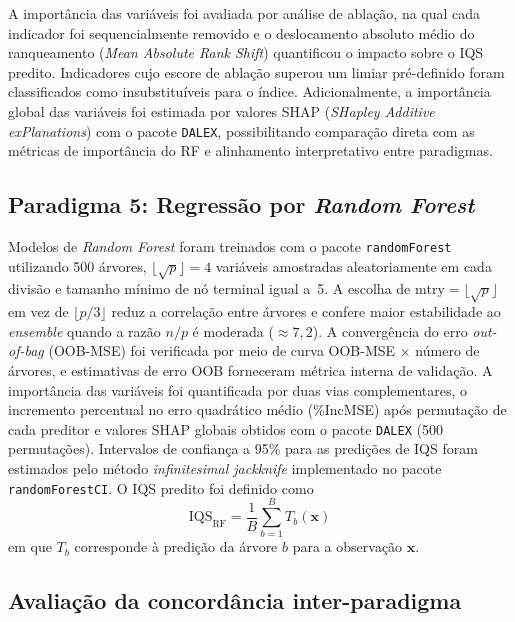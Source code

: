 \documentclass[pdflatex,sn-basic]{sn-jnl}%
\begin{document}
A importância das variáveis foi avaliada por análise de ablação, na qual cada indicador foi sequencialmente removido e o deslocamento absoluto médio do ranqueamento (\textit{Mean Absolute Rank Shift}) quantificou o impacto sobre o IQS predito. Indicadores cujo escore de ablação superou um limiar pré-definido foram classificados como insubstituíveis para o índice. Adicionalmente, a importância global das variáveis foi estimada por valores SHAP (\textit{SHapley Additive exPlanations}) com o pacote \texttt{DALEX}, possibilitando comparação direta com as métricas de importância do RF e alinhamento interpretativo entre paradigmas.

\subsection{Paradigma 5: Regressão por \textit{Random Forest}}\label{subsec:rf}

Modelos de \textit{Random Forest} foram treinados com o pacote \texttt{randomForest} utilizando 500 árvores, $\lfloor \sqrt{p} \rfloor = 4$ variáveis amostradas aleatoriamente em cada divisão e tamanho mínimo de nó terminal igual a~5. A escolha de $\text{mtry} = \lfloor \sqrt{p} \rfloor$ em vez de $\lfloor p/3 \rfloor$ reduz a correlação entre árvores e confere maior estabilidade ao \textit{ensemble} quando a razão $n/p$ é moderada ($\approx 7{,}2$). A convergência do erro \textit{out-of-bag} (OOB-MSE) foi verificada por meio de curva OOB-MSE $\times$ número de árvores, e estimativas de erro OOB forneceram métrica interna de validação. A importância das variáveis foi quantificada por duas vias complementares, o incremento percentual no erro quadrático médio (\%IncMSE) após permutação de cada preditor e valores SHAP globais obtidos com o pacote \texttt{DALEX} (500 permutações). Intervalos de confiança a 95\% para as predições de IQS foram estimados pelo método \textit{infinitesimal jackknife} implementado no pacote \texttt{randomForestCI}. O IQS predito foi definido como
\begin{equation}
\text{IQS}_{\text{RF}} = \frac{1}{B}\sum_{b=1}^{B} T_b(\mathbf{x})
\label{eq:rf}
\end{equation}
em que $T_b$ corresponde à predição da árvore $b$ para a observação $\mathbf{x}$.

\subsection{Avaliação da concordância inter-paradigma}\label{subsec:concordance}
\end{document}
